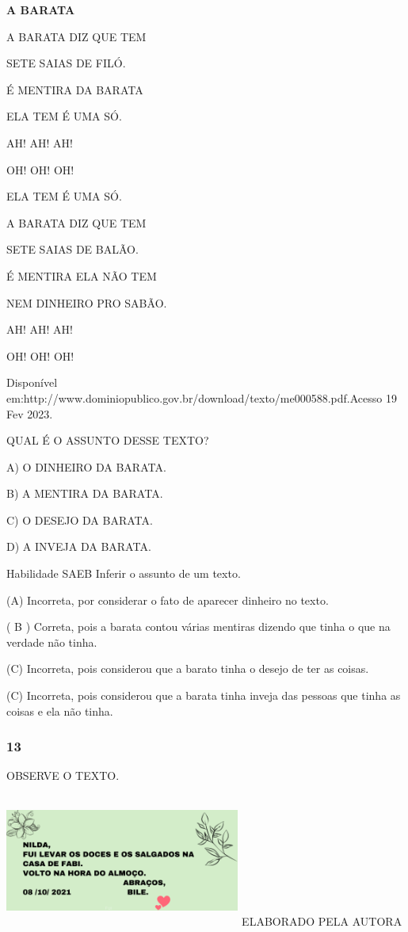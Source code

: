\begin{escola}
\textbf{A BARATA}

A BARATA DIZ QUE TEM

SETE SAIAS DE FILÓ.

É MENTIRA DA BARATA

ELA TEM É UMA SÓ.

AH! AH! AH!

OH! OH! OH!

ELA TEM É UMA SÓ.

A BARATA DIZ QUE TEM

\protect\hypertarget{_heading=h.nmf14n}{}{}SETE SAIAS DE BALÃO.

É MENTIRA ELA NÃO TEM

NEM DINHEIRO PRO SABÃO.

AH! AH! AH!

OH! OH! OH!

Disponível
em:http://www.dominiopublico.gov.br/download/texto/me000588.pdf.Acesso
19 Fev 2023.

QUAL É O ASSUNTO DESSE TEXTO?

A) O DINHEIRO DA BARATA.

B) A MENTIRA DA BARATA.

C) O DESEJO DA BARATA.

D) A INVEJA DA BARATA.

Habilidade SAEB Inferir o assunto de um texto.

(A) Incorreta, por considerar o fato de aparecer dinheiro no texto.

( B ) Correta, pois a barata contou várias mentiras dizendo que tinha o
que na verdade não tinha.

(C) Incorreta, pois considerou que a barato tinha o desejo de ter as
coisas.

(C) Incorreta, pois considerou que a barata tinha inveja das pessoas que
tinha as coisas e ela não tinha.

\subsubsection{13 }\label{section-53}

OBSERVE O TEXTO.

\includegraphics[width=3.04633in,height=1.71374in]{media/image220.png}
ELABORADO PELA AUTORA


\end{escola}
